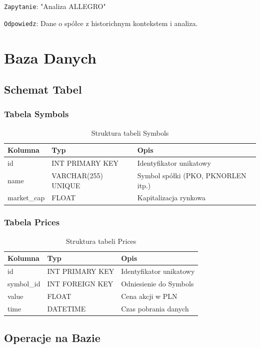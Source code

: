 \documentclass[11pt,a4paper]{article}
\begin{document}
\texttt{Zapytanie}: "Analiza ALLEGRO"

\texttt{Odpowiedz}: Dane o spółce z historichnym kontekstem i analiza.

\section{Baza Danych}

\subsection{Schemat Tabel}

\subsubsection{Tabela Symbols}

\begin{table}[H]
\centering
\begin{tabular}{|l|l|l|}
\hline
\textbf{Kolumna} & \textbf{Typ} & \textbf{Opis} \\
\hline
id & INT PRIMARY KEY & Identyfikator unikatowy \\
name & VARCHAR(255) UNIQUE & Symbol spółki (PKO, PKNORLEN itp.) \\
market\_cap & FLOAT & Kapitalizacja rynkowa \\
\hline
\end{tabular}
\caption{Struktura tabeli Symbols}
\end{table}

\subsubsection{Tabela Prices}

\begin{table}[H]
\centering
\begin{tabular}{|l|l|l|}
\hline
\textbf{Kolumna} & \textbf{Typ} & \textbf{Opis} \\
\hline
id & INT PRIMARY KEY & Identyfikator unikatowy \\
symbol\_id & INT FOREIGN KEY & Odniesienie do Symbols \\
value & FLOAT & Cena akcji w PLN \\
time & DATETIME & Czas pobrania danych \\
\hline
\end{tabular}
\caption{Struktura tabeli Prices}
\end{table}

\subsection{Operacje na Bazie}
\end{document}
